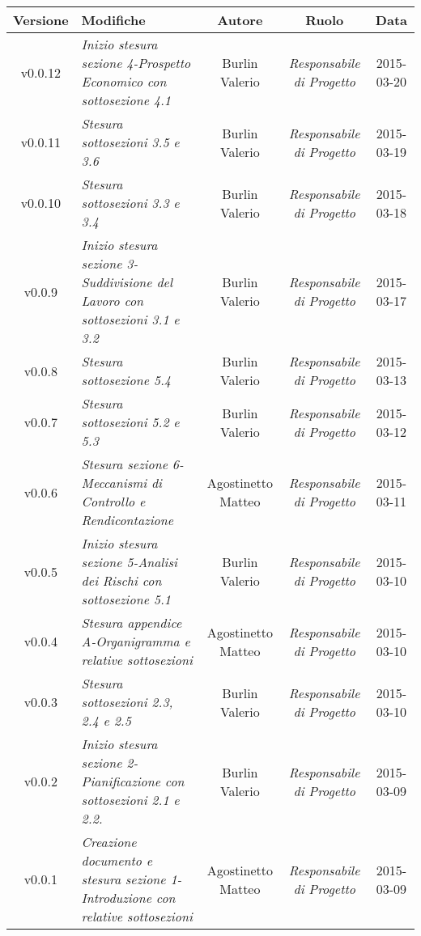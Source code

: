 \newpage

\begin{table}[h]
\centering
\begin{tabular}{|c|p{}|c|c|c|}
	\toprule
		\textbf{Versione} & \textbf{Modifiche} & \textbf{Autore} & \textbf{Ruolo} & \textbf{Data}\\
	\midrule
	\midrule
		v0.0.12 & \textit{Inizio stesura sezione 4-Prospetto Economico con sottosezione 4.1} & Burlin Valerio & \textit{Responsabile di Progetto} & 2015-03-20\\
	\midrule
		v0.0.11 & \textit{Stesura sottosezioni 3.5 e 3.6} & Burlin Valerio & \textit{Responsabile di Progetto} & 2015-03-19\\
	\midrule
		v0.0.10 & \textit{Stesura sottosezioni 3.3 e 3.4} & Burlin Valerio & \textit{Responsabile di Progetto} & 2015-03-18\\
	\midrule
		v0.0.9 & \textit{Inizio stesura sezione 3-Suddivisione del Lavoro con sottosezioni 3.1 e 3.2} & Burlin Valerio & \textit{Responsabile di Progetto} & 2015-03-17\\
	\midrule
		v0.0.8 & \textit{Stesura sottosezione 5.4} & Burlin Valerio & \textit{Responsabile di Progetto} & 2015-03-13\\
	\midrule
		v0.0.7 & \textit{Stesura sottosezioni 5.2 e 5.3} & Burlin Valerio & \textit{Responsabile di Progetto} & 2015-03-12\\
	\midrule
		v0.0.6 & \textit{Stesura sezione 6-Meccanismi di Controllo e Rendicontazione} & Agostinetto Matteo & \textit{Responsabile di Progetto} & 2015-03-11\\
	\midrule
		v0.0.5 & \textit{Inizio stesura sezione 5-Analisi dei Rischi con sottosezione 5.1} & Burlin Valerio & \textit{Responsabile di Progetto} & 2015-03-10\\
	\midrule
		v0.0.4 & \textit{Stesura appendice A-Organigramma e relative sottosezioni} & Agostinetto Matteo & \textit{Responsabile di Progetto} & 2015-03-10\\
	\midrule
		v0.0.3 & \textit{Stesura sottosezioni 2.3, 2.4 e 2.5} & Burlin Valerio & \textit{Responsabile di Progetto} & 2015-03-10\\
	\midrule
		v0.0.2 & \textit{Inizio stesura sezione 2-Pianificazione con sottosezioni 2.1 e 2.2.} & Burlin Valerio & \textit{Responsabile di Progetto} & 2015-03-09\\
	\midrule
		v0.0.1 & \textit{Creazione documento e stesura sezione 1-Introduzione con relative sottosezioni} & Agostinetto Matteo & \textit{Responsabile di Progetto} & 2015-03-09\\	
	\bottomrule
\end{tabular}
\end{table}

\newpage